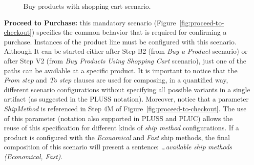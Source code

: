 \documentclass{acm_proc_article-sp}
\begin{document}
\begin{figure}[h]
\caption{Buy products with shopping cart scenario.}
\label{fig:buy-product-changing-flow}
\end{figure}

{\bf Proceed to Purchase:} this mandatory scenario (Figure~\ref{fig:proceed-to-checkout}) specifies the common behavior that is required for confirming a purchase. Instances of the product line must be configured with this scenario. Although It can be started  either after Step B2 (from \emph{Buy a Product} scenario) or after Step V2 (from \emph{Buy Products Using Shopping Cart} scenario), just one of the paths can be available at a specific product. 
It is important to notice that the \emph{From step} and \emph{To step} clauses are used for composing, in a quantified way, different scenario configurations without specifying all possible variants in a single artifact (as suggested in the PLUSS notation). Moreover, notice that a parameter \emph{ShipMethod} is referenced in Step 4M of Figure~\ref{fig:proceed-to-checkout}. The use of this parameter (notation also supported in PLUSS and PLUC) allows the reuse of this specification 
for different kinds of \emph{ship method} configurations. If a product is configured with the \emph{Economical} and \emph{Fast} ship methods, the final composition of this scenario will present a sentence: \emph{\ldots available ship methods (Economical, Fast)}.
\end{document}

